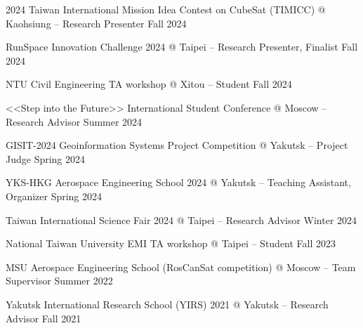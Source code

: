 2024 Taiwan International Mission Idea Contest on CubeSat (TIMICC) @ Kaohsiung -- Research Presenter \hfill Fall 2024 

RunSpace Innovation Challenge 2024 @ Taipei -- Research Presenter, Finalist \hfill Fall 2024

NTU Civil Engineering TA workshop @ Xitou -- Student \hfill Fall 2024

<<Step into the Future>> International Student Conference @ Moscow -- Research Advisor \hfill Summer 2024

GISIT-2024 Geoinformation Systems Project Competition @ Yakutsk -- Project Judge \hfill Spring 2024

YKS-HKG Aerospace Engineering School 2024 @ Yakutsk -- Teaching Assistant, Organizer \hfill Spring 2024

Taiwan International Science Fair 2024 @ Taipei -- Research Advisor \hfill Winter 2024

National Taiwan University EMI TA workshop @ Taipei -- Student \hfill Fall 2023

MSU Aerospace Engineering School (RosCanSat competition) @ Moscow -- Team Supervisor \hfill Summer 2022

Yakutsk International Research School (YIRS) 2021 @ Yakutsk -- Research Advisor  \hfill Fall 2021

